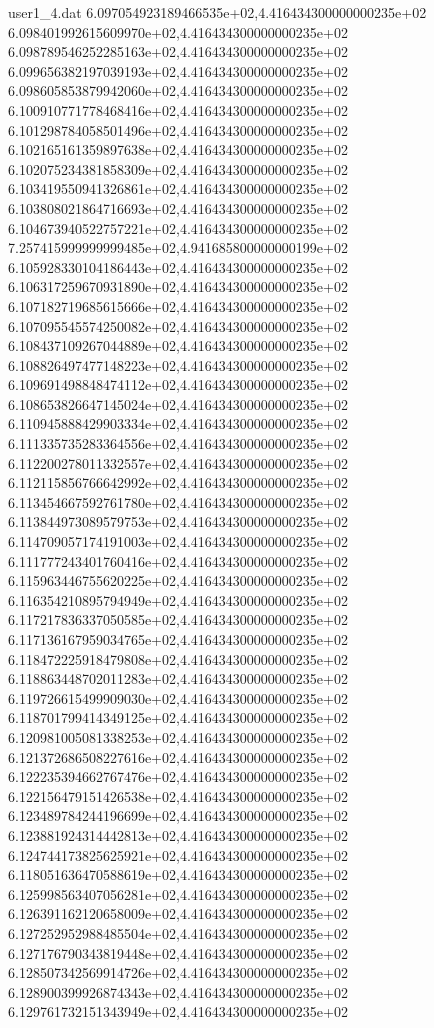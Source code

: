 \begin{filecontents}{user1_4.dat}
6.097054923189466535e+02,4.416434300000000235e+02
6.098401992615609970e+02,4.416434300000000235e+02
6.098789546252285163e+02,4.416434300000000235e+02
6.099656382197039193e+02,4.416434300000000235e+02
6.098605853879942060e+02,4.416434300000000235e+02
6.100910771778468416e+02,4.416434300000000235e+02
6.101298784058501496e+02,4.416434300000000235e+02
6.102165161359897638e+02,4.416434300000000235e+02
6.102075234381858309e+02,4.416434300000000235e+02
6.103419550941326861e+02,4.416434300000000235e+02
6.103808021864716693e+02,4.416434300000000235e+02
6.104673940522757221e+02,4.416434300000000235e+02
7.257415999999999485e+02,4.941685800000000199e+02
6.105928330104186443e+02,4.416434300000000235e+02
6.106317259670931890e+02,4.416434300000000235e+02
6.107182719685615666e+02,4.416434300000000235e+02
6.107095545574250082e+02,4.416434300000000235e+02
6.108437109267044889e+02,4.416434300000000235e+02
6.108826497477148223e+02,4.416434300000000235e+02
6.109691498848474112e+02,4.416434300000000235e+02
6.108653826647145024e+02,4.416434300000000235e+02
6.110945888429903334e+02,4.416434300000000235e+02
6.111335735283364556e+02,4.416434300000000235e+02
6.112200278011332557e+02,4.416434300000000235e+02
6.112115856766642992e+02,4.416434300000000235e+02
6.113454667592761780e+02,4.416434300000000235e+02
6.113844973089579753e+02,4.416434300000000235e+02
6.114709057174191003e+02,4.416434300000000235e+02
6.111777243401760416e+02,4.416434300000000235e+02
6.115963446755620225e+02,4.416434300000000235e+02
6.116354210895794949e+02,4.416434300000000235e+02
6.117217836337050585e+02,4.416434300000000235e+02
6.117136167959034765e+02,4.416434300000000235e+02
6.118472225918479808e+02,4.416434300000000235e+02
6.118863448702011283e+02,4.416434300000000235e+02
6.119726615499909030e+02,4.416434300000000235e+02
6.118701799414349125e+02,4.416434300000000235e+02
6.120981005081338253e+02,4.416434300000000235e+02
6.121372686508227616e+02,4.416434300000000235e+02
6.122235394662767476e+02,4.416434300000000235e+02
6.122156479151426538e+02,4.416434300000000235e+02
6.123489784244196699e+02,4.416434300000000235e+02
6.123881924314442813e+02,4.416434300000000235e+02
6.124744173825625921e+02,4.416434300000000235e+02
6.118051636470588619e+02,4.416434300000000235e+02
6.125998563407056281e+02,4.416434300000000235e+02
6.126391162120658009e+02,4.416434300000000235e+02
6.127252952988485504e+02,4.416434300000000235e+02
6.127176790343819448e+02,4.416434300000000235e+02
6.128507342569914726e+02,4.416434300000000235e+02
6.128900399926874343e+02,4.416434300000000235e+02
6.129761732151343949e+02,4.416434300000000235e+02

\end{filecontents}
